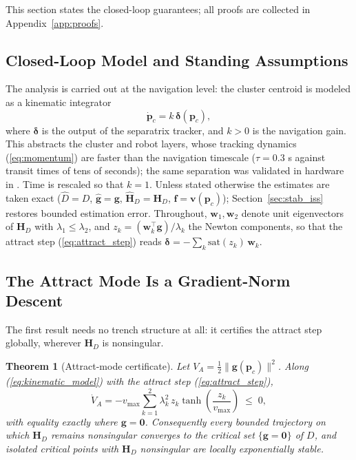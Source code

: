 \documentclass[lettersize,journal]{IEEEtran}
\newtheorem{theorem}{Theorem}
\begin{document}
This section states the closed-loop guarantees; all proofs are
collected in Appendix~\ref{app:proofs}.

\subsection{Closed-Loop Model and Standing Assumptions}

The analysis is carried out at the navigation level: the cluster
centroid is modeled as a kinematic integrator
\begin{equation}
    \dot{\mathbf{p}}_c = k\,\boldsymbol{\delta}(\mathbf{p}_c),
    \label{eq:kinematic_model}
\end{equation}
where $\boldsymbol{\delta}$ is the output of the separatrix tracker,
and $k > 0$ is the navigation gain. This abstracts the cluster and
robot layers, whose
tracking dynamics (\ref{eq:momentum}) are faster than the navigation
timescale ($\tau = 0.3$ s against transit times of tens of seconds);
the same separation was validated in hardware in \cite{14}. Time is rescaled
so that $k = 1$. Unless stated otherwise the estimates are taken exact
($\hat{D} = D$, $\hat{\mathbf{g}} = \mathbf{g}$, $\hat{\mathbf{H}}_D =
\mathbf{H}_D$, $\mathbf{f} = \mathbf{v}(\mathbf{p}_c)$);
Section~\ref{sec:stab_iss} restores bounded estimation error.
Throughout, $\mathbf{w}_1, \mathbf{w}_2$ denote unit eigenvectors of
$\mathbf{H}_D$ with $\lambda_1 \leq \lambda_2$, and $z_k =
(\mathbf{w}_k^\top \mathbf{g})/\lambda_k$ the Newton components, so
that the attract step (\ref{eq:attract_step}) reads
$\boldsymbol{\delta} = -\sum_k \mathrm{sat}(z_k)\,\mathbf{w}_k$.

\subsection{The Attract Mode Is a Gradient-Norm Descent}

The first result needs no trench structure at all: it certifies the attract step
globally, wherever $\mathbf{H}_D$ is nonsingular.

\begin{theorem}[Attract-mode certificate]
\label{thm:attract}
Let $V_A = \tfrac{1}{2}\|\mathbf{g}(\mathbf{p}_c)\|^2$. Along
(\ref{eq:kinematic_model}) with the attract step
(\ref{eq:attract_step}),
\begin{equation}
    \dot{V}_A = -v_{\max} \sum_{k=1}^{2} \lambda_k^2\,
    z_k \tanh\!\left(\frac{z_k}{v_{\max}}\right) \;\leq\; 0,
    \label{eq:VA_dot}
\end{equation}
with equality exactly where $\mathbf{g} = \mathbf{0}$. Consequently
every bounded trajectory on which $\mathbf{H}_D$ remains nonsingular
converges to the critical set $\{\mathbf{g} = \mathbf{0}\}$ of $D$, and
isolated critical points with $\mathbf{H}_D$ nonsingular are locally
exponentially stable.
\end{theorem}
\end{document}
